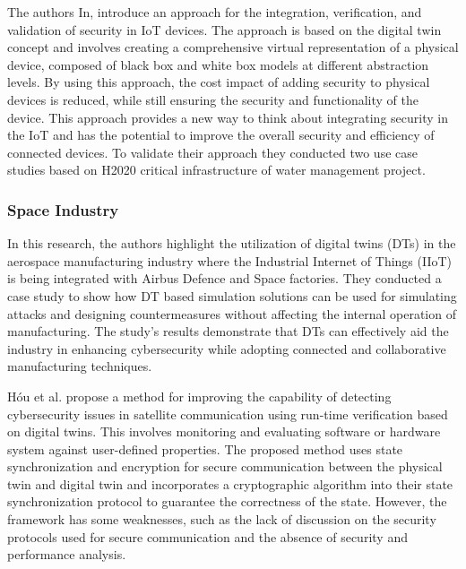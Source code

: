The authors In\cite{maillet-contozEndtoendSecurityValidation2020}, introduce an approach for the integration, verification, and validation of security in IoT devices. The approach is based on the digital twin concept and involves creating a comprehensive virtual representation of a physical device, composed of black box and white box models at different abstraction levels. By using this approach, the cost impact of adding security to physical devices is reduced, while still ensuring the security and functionality of the device. This approach provides a new way to think about integrating security in the IoT and has the potential to improve the overall security and efficiency of connected devices. To validate their approach they conducted two use case studies based on H2020 critical infrastructure of water management project.

\subsubsection{Space Industry}

In \cite{adrienbacueDigitalTwinsEnhanced2022} this research, the authors highlight the utilization of digital twins (DTs) in the aerospace manufacturing industry where the Industrial Internet of Things (IIoT) is being integrated with Airbus Defence and Space factories. They conducted a case study to show how DT based simulation solutions can be used for simulating attacks and designing countermeasures without affecting the internal operation of manufacturing. The study's results demonstrate that DTs can effectively aid the industry in enhancing cybersecurity while adopting connected and collaborative manufacturing techniques.

Hóu et al.\cite{houDigitalTwinRuntime2022} propose a method for improving the capability of detecting cybersecurity issues in satellite communication using run-time verification based on digital twins. This involves monitoring and evaluating software or hardware system against user-defined properties. The proposed method uses state synchronization and encryption for secure communication between the physical twin and digital twin and incorporates a cryptographic algorithm into their state synchronization protocol to guarantee the correctness of the state. However, the framework has some weaknesses, such as the lack of discussion on the security protocols used for secure communication and the absence of security and performance analysis.

